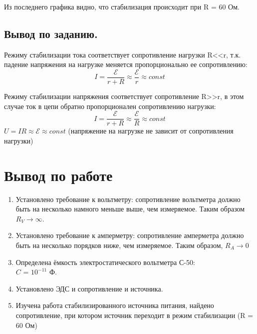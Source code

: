 \documentclass[a4paper,12pt]{article}
\begin{document}
Из последнего графика видно, что стабилизация происходит при R = 60 Ом.

\subsection{Вывод по заданию.}
Режиму стабилизации тока соответствует сопротивление нагрузки R<<r, т.к. падение
напряжения на нагрузке меняется пропорционально ее сопротивлению:
\begin{equation}
    I = \frac{\mathcal{E}}{r+R} \approx \frac{\mathcal{E}}{r} \approx const
\end{equation}

Режиму стабилизации напряжения соответствует сопротивление R>>r, в этом случае ток в
цепи обратно пропорционален сопротивлению нагрузки:
\begin{equation}
    I = \frac{\mathcal{E}}{r+R} \approx \frac{\mathcal{E}}{R} \approx const
\end{equation}
$U=IR\approx\mathcal{E}\approx const$ (напряжение на нагрузке не зависит от сопротивления нагрузки)

\section{Вывод по работе}
\begin{enumerate}
    \item Установлено требование к вольтметру: сопротивление вольтметра
должно быть на несколько намного меньше выше, чем измеряемое. Таким образом $R_V \xrightarrow{} \infty$.
    \item Установлено требование к амперметру: сопротивление амперметра
должно быть на несколько порядков ниже, чем измеряемое. Таким образом, $R_A \xrightarrow{} 0$ 
    \item Определена ёмкость электростатического вольтметра С-50:\\ $C$ = $10^{-11}$ Ф.
    \item Установлено ЭДС и сопротивление и источника.
    \item Изучена работа стабилизированного источника питания, найдено сопротивление, при котором источник переходит в режим стабилизации (R = 60 Ом)

\end{enumerate}
\end{document}
